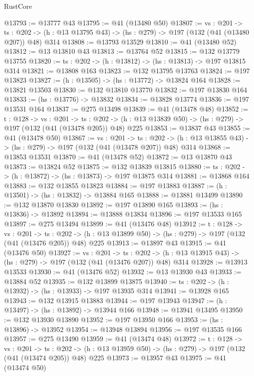 \begin{lexlean}{RustCore}
\begin{coremodule}
@13793 := @13777 @43
@13795 := @41 (@13480 @50)
@13807 := {vs : @201} ->
  {ts : @202} -> (h : @13 @13795 @43) -> (hs : @279) -> @197 (@132 (@41 (@13480 @207)) @48) @314
@13808 := @13793 @13529
@13810 := @41 (@13480 @52)
@13812 := @13 @13810 @43
@13813 := @13764 @52
@13815 := @132 @13779 @13755
@13820 := {ts : @202} -> (h : @13812) -> (hs : @13813) -> @197 @13815 @314
@13821 := @13808 @163
@13823 := @132 @13795 @13763
@13824 := @197 @13823
@13827 := (h : @13505) -> (hs : @13772) -> @13824 @164
@13828 := @13821 @13503
@13830 := @132 @13810 @13770
@13832 := @197 @13830 @164
@13833 := (hs : @13776) -> @13832
@13834 := @13828 @13774
@13836 := @197 @13531 @164
@13837 := @275 @13498
@13839 := @41 (@13478 @48)
@13852 := {t : @128} ->
  {vs : @201} ->
  {ts : @202} -> (h : @13 @13839 @50) -> (hs : @279) -> @197 (@132 (@41 (@13478 @205)) @48) @225
@13853 := @13837 @43
@13855 := @41 (@13478 @50)
@13867 := {vs : @201} ->
  {ts : @202} -> (h : @13 @13855 @43) -> (hs : @279) -> @197 (@132 (@41 (@13478 @207)) @48) @314
@13868 := @13853 @13531
@13870 := @41 (@13478 @52)
@13872 := @13 @13870 @43
@13873 := @13824 @52
@13875 := @132 @13839 @13815
@13880 := {ts : @202} -> (h : @13872) -> (hs : @13873) -> @197 @13875 @314
@13881 := @13868 @164
@13883 := @132 @13855 @13823
@13884 := @197 @13883
@13887 := (h : @13501) -> (hs : @13832) -> @13884 @165
@13888 := @13881 @13499
@13890 := @132 @13870 @13830
@13892 := @197 @13890 @165
@13893 := (hs : @13836) -> @13892
@13894 := @13888 @13834
@13896 := @197 @13533 @165
@13897 := @275 @13494
@13899 := @41 (@13476 @48)
@13912 := {t : @128} ->
  {vs : @201} ->
  {ts : @202} -> (h : @13 @13899 @50) -> (hs : @279) -> @197 (@132 (@41 (@13476 @205)) @48) @225
@13913 := @13897 @43
@13915 := @41 (@13476 @50)
@13927 := {vs : @201} ->
  {ts : @202} -> (h : @13 @13915 @43) -> (hs : @279) -> @197 (@132 (@41 (@13476 @207)) @48) @314
@13928 := @13913 @13533
@13930 := @41 (@13476 @52)
@13932 := @13 @13930 @43
@13933 := @13884 @52
@13935 := @132 @13899 @13875
@13940 := {ts : @202} -> (h : @13932) -> (hs : @13933) -> @197 @13935 @314
@13941 := @13928 @165
@13943 := @132 @13915 @13883
@13944 := @197 @13943
@13947 := (h : @13497) -> (hs : @13892) -> @13944 @166
@13948 := @13941 @13495
@13950 := @132 @13930 @13890
@13952 := @197 @13950 @166
@13953 := (hs : @13896) -> @13952
@13954 := @13948 @13894
@13956 := @197 @13535 @166
@13957 := @275 @13490
@13959 := @41 (@13474 @48)
@13972 := {t : @128} ->
  {vs : @201} ->
  {ts : @202} -> (h : @13 @13959 @50) -> (hs : @279) -> @197 (@132 (@41 (@13474 @205)) @48) @225
@13973 := @13957 @43
@13975 := @41 (@13474 @50)

\end{coremodule}
\end{lexlean}
